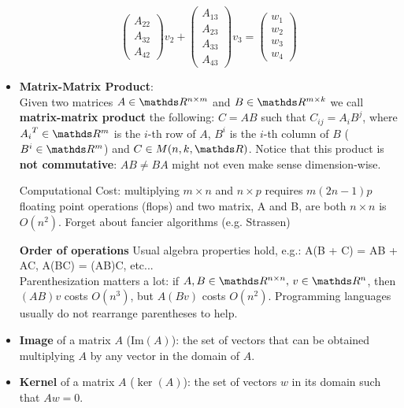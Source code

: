 \documentclass[computationalMathematics.tex]{subfiles}
\begin{document}
\begin{itemize}
$$\begin{pmatrix}
                A_{22}\\
                A_{32}\\
                A_{42}
        \end{pmatrix}v_2 + 
        \begin{pmatrix}
                A_{13}\\
                A_{23}\\
                A_{33}\\
                A_{43}
        \end{pmatrix}v_3 =
        \begin{pmatrix}
                  w_1\\
                  w_2\\
                  w_3\\
                  w_4
        \end{pmatrix}
        $$
  \item \textbf{Matrix-Matrix Product}:\\
        Given two matrices $A \in \R^{n\times m}$ and $B \in \R^{m\times k}$ we call \textbf{matrix-matrix product} the following:
        $C=AB$ such that $C_{ij} = A_i B^j$, where $\tr{A_i} \in \R^m$ is the $i$-th row of $A$, $B^i$ is the $i$-th column of $B$ ($B^i \in \R^m$) and $C \in M(n, k, \R)$. Notice that this product is \textbf{not commutative}: $AB \neq BA$ might not even make sense dimension-wise.
        
        Computational Cost: multiplying $m \times n$ and $n \times p$ requires $m(2n - 1)p$ floating point operations (flops) and two matrix, A and B, are both $ n \times n$ is $O(n^2)$. Forget about fancier algorithms (e.g. Strassen)
        
        \begin{myframe}{\bf Order of operations}
        Usual algebra properties hold, e.g.: A(B + C) = AB + AC, A(BC) = (AB)C, etc... \\
        Parenthesization matters a lot: if $A, B \in \R^{n \times n }, \, v \in \R^n$, then $(AB)v$ costs $O(n^3)$, but $A(Bv)$ costs $O(n^2)$.
        Programming languages usually do not rearrange parentheses to help.
        \end{myframe}

     \item \textbf{Image} of a matrix $A$ ($\text{Im}(A)$):  the set of vectors that can    be obtained multiplying $A$ by any vector in the domain of $A$.

     \item \textbf{Kernel} of a matrix $A$ ($\ker(A)$):  the set of vectors $w$ in its domain such that $Aw=0$.


\end{itemize}
\end{document}
